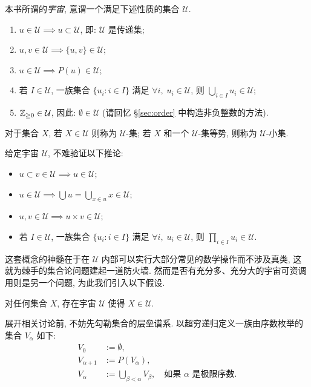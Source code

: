 \begin{definition}
	本书所谓的\emph{宇宙}, 意谓一个满足下述性质的集合 $\mathcal{U}$.
	\begin{enumerate}[\bfseries {U}.1]
		\item $u \in \mathcal{U} \implies u \subset \mathcal{U}$, 即: $\mathcal{U}$ 是传递集;
		\item $u,v \in \mathcal{U} \implies \{u, v\} \in \mathcal{U}$;
		\item $u \in \mathcal{U} \implies P(u) \in \mathcal{U}$;
		\item 若 $I \in \mathcal{U}$, 一族集合 $\{u_i : i \in I\}$ 满足 $\forall i, \; u_i \in \mathcal{U}$, 则 $\bigcup_{i \in I} u_i \in \mathcal{U}$;
		\item $\mathbb{Z}_{\geq 0} \in \mathcal{U}$, 因此: $\emptyset \in \mathcal{U}$ (请回忆 \S\ref{sec:order} 中构造非负整数的方法).
	\end{enumerate}
	对于集合 $X$, 若 $X \in \mathcal{U}$ 则称为 $\mathcal{U}$-集; 若 $X$ 和一个 $\mathcal{U}$-集等势, 则称为 $\mathcal{U}$-小集.
\end{definition}

给定宇宙 $\mathcal{U}$, 不难验证以下推论:
\begin{itemize}
	\item $u \subset v \in \mathcal{U} \implies u \in \mathcal{U}$;
	\item $u \in \mathcal{U} \implies \bigcup u = \bigcup_{x \in u} x  \in \mathcal{U}$;
	\item $u, v \in \mathcal{U} \implies u \times v \in \mathcal{U}$;
	\item 若 $I \in \mathcal{U}$, 一族集合 $\{u_i : i \in I\}$ 满足 $\forall i, \; u_i \in \mathcal{U}$, 则 $\prod_{i \in I} u_i \in \mathcal{U}$.
\end{itemize}

这套概念的神髓在于在 $\mathcal{U}$ 内部可以实行大部分常见的数学操作而不涉及真类, 这就为棘手的集合论问题建起一道防火墙. 然而是否有充分多、充分大的宇宙可资调用则是另一个问题, 为此我们引入以下假设.

\begin{hypothesis}[A.\ Grothendieck]\label{hyp:universe}
	对任何集合 $X$, 存在宇宙 $\mathcal{U}$ 使得 $X \in \mathcal{U}$.
\end{hypothesis}

展开相关讨论前, 不妨先勾勒集合的层垒谱系. 以超穷递归定义一族由序数枚举的集合 $V_\alpha$ 如下: 
\begin{align*}
	V_0 & := \emptyset, \\
	V_{\alpha+1} & := P(V_\alpha), \\
	V_\alpha & :=\bigcup_{\beta < \alpha} V_\beta, \quad \text{如果 $\alpha$ 是极限序数}.
\end{align*}

